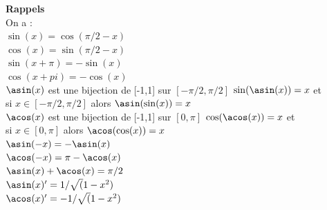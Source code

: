 \documentclass[a4paper,11pt]{book}
\begin{document}
{\bf Rappels}\\
On a :\\
$\sin(x)=\cos(\pi/2-x)$\\
$\cos(x)=\sin(\pi/2-x)$\\
$\sin(x+\pi)=-\sin(x)$\\
$\cos(x+pi)=-\cos(x)$\\
$\asin(x)$ est une bijection  de [-1,1] sur $[-\pi/2,\pi/2]$
$\sin(\asin(x))=x$  et \\
si $x\in [-\pi/2,\pi/2]$ alors $\asin(\sin(x))=x$\\
$\acos(x)$ est une bijection  de [-1,1] sur $[0,\pi]$
$\cos(\acos(x))=x$ et \\
si $x\in [0,\pi]$ alors $\acos(\cos(x))=x$\\
$\asin(-x)=-\asin(x)$\\
$\acos(-x)=\pi-\acos(x)$\\
$\asin(x)+\acos(x)=\pi/2$\\
$\asin(x)'=1/\sqrt(1-x^2)$\\
$\acos(x)'=-1/\sqrt(1-x^2)$\\
\end{document}
